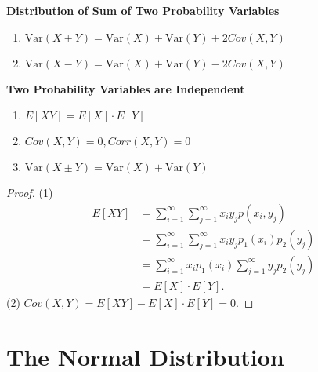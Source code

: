\documentclass[12pt,openany]{book}
\theoremstyle{definition}
\newcommand{\Var}{\text{Var}}
\newcommand{\Cov}{\textit{Cov}}
\newcommand{\Corr}{\textit{Corr}}
\begin{document}
	\begin{tcolorbox}[colback=white]\begin{center}
			\textbf{Distribution of Sum of Two Probability Variables}
		\end{center} \begin{enumerate}
			\item \(\Var(X+Y)=\Var(X)+\Var(Y)+2\Cov(X,Y) \)
			\item \(\Var(X-Y)=\Var(X)+\Var(Y)-2\Cov(X,Y) \)
		\end{enumerate}	
	\end{tcolorbox}
	
	\begin{tcolorbox}[colback=white]\begin{center}
			\textbf{Two Probability Variables are Independent}
		\end{center}\begin{enumerate}
			\item \(E[XY]=E[X]\cdot E[Y] \)
			\item \(\Cov(X,Y)=0, \Corr(X,Y)=0 \)
			\item \(\Var(X\pm Y)=\Var(X)+\Var(Y) \)
		\end{enumerate}\begin{proof}
			(1) \begin{align*}
			E[XY] &= \sum_{i=1}^\infty\sum_{j=1}^\infty x_iy_jp(x_i,y_j) \\
			&= \sum_{i=1}^\infty\sum_{j=1}^\infty x_iy_jp_1(x_i)p_2(y_j) \\
			&= \sum_{i=1}^\infty x_ip_1(x_i)\sum_{j=1}^\infty y_jp_2(y_j)  \\
			&=E[X]\cdot E[Y].
			\end{align*} 
			(2) $\Cov(X,Y) = E[XY]-E[X]\cdot E[Y]=0$.
		\end{proof}
		
	\end{tcolorbox}
	
	\section{The Normal Distribution}
	
\end{document}
